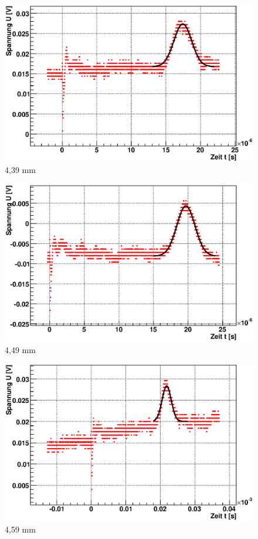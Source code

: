 \documentclass[12pt]{article}
\begin{document}
\begin{figure}[H]  
\begin{minipage}{0.33\linewidth}
\centering
\includegraphics[width=0.9\linewidth]{pictures/varDist/03.eps}
\small{4,39 mm}
\end{minipage}
\begin{minipage}{0.33\linewidth}
\centering
\includegraphics[width=0.9\linewidth]{pictures/varDist/06.eps}
\small{4,49 mm}
\end{minipage}
\begin{minipage}{0.33\linewidth}
\centering 
\includegraphics[width=0.9\linewidth]{pictures/varDist/04.eps}
\small{4,59 mm}
\end{minipage}
\end{figure}
\end{document}

